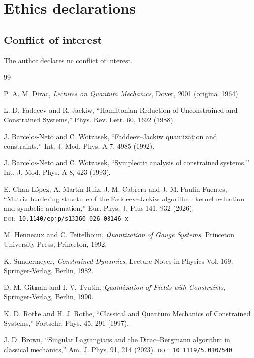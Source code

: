 \documentclass[12pt]{article}
\theoremstyle{plain}
\theoremstyle{definition}
\theoremstyle{remark}
\newcommand{\doi}[1]{\textsc{doi:}~\texttt{#1}}
\begin{document}
	
	\section*{Ethics declarations}
	\subsection*{Conflict of interest}
	The author declares no conflict of interest.
	
	
	\begin{thebibliography}{99}
		
		 P. A. M. Dirac, \emph{Lectures on Quantum Mechanics},
		Dover, 2001 (original 1964).
		
		 L. D. Faddeev and R. Jackiw, ``Hamiltonian Reduction of
		Unconstrained and Constrained Systems,'' Phys. Rev. Lett. \textrm{60}, 1692
		(1988).
		
		 J. Barcelos-Neto and C. Wotzasek, ``Faddeev--Jackiw
		quantization and constraints,'' Int. J. Mod. Phys. A \textrm{7}, 4985 (1992).
		
		 J. Barcelos-Neto and C. Wotzasek, ``Symplectic analysis of
		constrained systems,'' Int. J. Mod. Phys. A \textrm{8}, 423 (1993).
		
		 E. Chan-L\'opez, A. Mart\'in-Ruiz, J. M. Cabrera and
		J. M. Paulin Fuentes, ``Matrix bordering structure of the Faddeev--Jackiw
		algorithm: kernel reduction and symbolic automation,'' Eur. Phys. J. Plus
		\textrm{141}, 932 (2026). \doi{10.1140/epjp/s13360-026-08146-x}
		
		 M. Henneaux and C. Teitelboim, \emph{Quantization of Gauge
			Systems}, Princeton University Press, Princeton, 1992.
		
		 K. Sundermeyer, \emph{Constrained Dynamics}, Lecture
		Notes in Physics Vol. 169, Springer-Verlag, Berlin, 1982.
		
		 D. M. Gitman and I. V. Tyutin, \emph{Quantization of Fields
			with Constraints}, Springer-Verlag, Berlin, 1990.
		
		 K. D. Rothe and H. J. Rothe, ``Classical and Quantum Mechanics
		of Constrained Systems,'' Fortschr. Phys. \textrm{45}, 291 (1997).
		
		 J. D. Brown, ``Singular Lagrangians and the
		Dirac--Bergmann algorithm in classical mechanics,'' Am. J. Phys. \textrm{91},
		214 (2023). \doi{10.1119/5.0107540}
		

\end{thebibliography}
\end{document}
